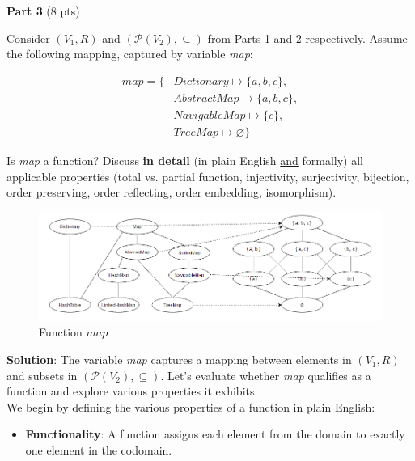 \documentclass[12pt]{article}
\begin{document}
\begin{spacing}{1.5}
\begin{enumerate}
	\end{enumerate}
			    
	\noindent \textbf{Part 3} (8 pts)
			
	\noindent Consider $(V_1, R)$ and $(\mathcal{P}(V_2), \subseteq)$ from Parts 1 and 2 respectively. Assume the following mapping, captured by variable \textit{map}:
			
	\begin{align*}
		map = \{ & Dictionary \mapsto \{a,b,c\},  \\
		         & AbstractMap \mapsto \{a,b,c\}, \\
		         & NavigableMap \mapsto \{c\},    \\
		         & TreeMap \mapsto \varnothing\}  
	\end{align*}
			
	\noindent Is \textit{map} a function? Discuss \textbf{in detail} (in plain English \uline{and} formally) all applicable properties (total vs. partial function, injectivity, surjectivity, bijection, order preserving, order reflecting, order embedding, isomorphism).\\
		
	\begin{figure}[htp]
		\centering
		\includegraphics[width=1.1\textwidth]{static/FunctionMapping_6_3.png}
		\caption{Function $map$}
		\label{fig:figure}
	\end{figure}
		
	\noindent \textbf{Solution}: The variable \textit{map} captures a mapping between elements in $(V_1, R)$ and subsets in $(\mathcal{P}(V_2), \subseteq)$. Let's evaluate whether \textit{map} qualifies as a function and explore various properties it exhibits.\\
		
	\noindent We begin by defining the various properties of a function in plain English:
		
	\begin{itemize}
		\item \textbf{Functionality}: A function assigns each element from the domain to exactly one element in the codomain.
		      		              

\end{itemize}
\end{spacing}
\end{document}
